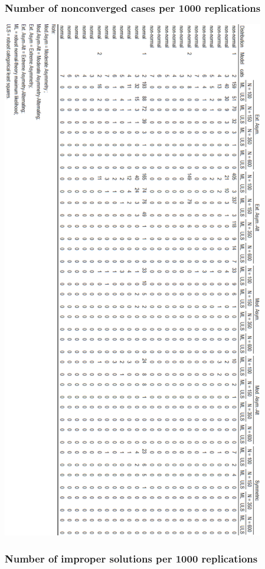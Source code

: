 \documentclass[10,a4paperpaper,]{article}
\begin{document}
\subsubsection{Number of nonconverged cases per 1000 replications}

\includegraphics[width=325pt]{./figures/tabA2_A3}

\subsubsection{Number of improper solutions per 1000 replications}
\end{document}
